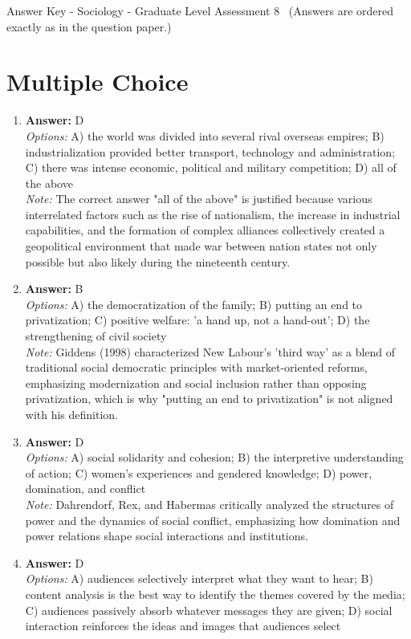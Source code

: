 \documentclass[12pt]{article}
\begin{document}
\begin{center}
Answer Key - Sociology - Graduate Level Assessment 8 \
\small (Answers are ordered exactly as in the question paper.)
\end{center}

\section*{Multiple Choice}
\begin{enumerate}[label=\arabic*.]
\item \textbf{Answer:} D
\\ \textit{Options:} A) the world was divided into several rival overseas empires; B) industrialization provided better transport, technology and administration; C) there was intense economic, political and military competition; D) all of the above
\\ \textit{Note:} The correct answer "all of the above" is justified because various interrelated factors such as the rise of nationalism, the increase in industrial capabilities, and the formation of complex alliances collectively created a geopolitical environment that made war between nation states not only possible but also likely during the nineteenth century.
\item \textbf{Answer:} B
\\ \textit{Options:} A) the democratization of the family; B) putting an end to privatization; C) positive welfare: 'a hand up, not a hand-out'; D) the strengthening of civil society
\\ \textit{Note:} Giddens (1998) characterized New Labour's 'third way' as a blend of traditional social democratic principles with market-oriented reforms, emphasizing modernization and social inclusion rather than opposing privatization, which is why "putting an end to privatization" is not aligned with his definition.
\item \textbf{Answer:} D
\\ \textit{Options:} A) social solidarity and cohesion; B) the interpretive understanding of action; C) women's experiences and gendered knowledge; D) power, domination, and conflict
\\ \textit{Note:} Dahrendorf, Rex, and Habermas critically analyzed the structures of power and the dynamics of social conflict, emphasizing how domination and power relations shape social interactions and institutions.
\item \textbf{Answer:} D
\\ \textit{Options:} A) audiences selectively interpret what they want to hear; B) content analysis is the best way to identify the themes covered by the media; C) audiences passively absorb whatever messages they are given; D) social interaction reinforces the ideas and images that audiences select

\end{enumerate}
\end{document}
